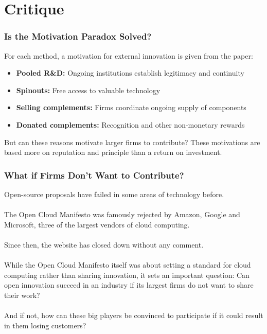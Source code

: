 \documentclass{beamer}
\begin{document}
\section{Critique}

\begin{frame}
\frametitle{Is the Motivation Paradox Solved?}
For each method, a motivation for external innovation is given from the paper:
\begin{itemize}
\item \textbf{Pooled R\&D:} Ongoing institutions establish legitimacy and continuity
\item \textbf{Spinouts:} Free access to valuable technology
\item \textbf{Selling complements:} Firms coordinate ongoing supply of components
\item \textbf{Donated complements:} Recognition and other non-monetary rewards
\end{itemize}

But can these reasons motivate larger firms to contribute? These motivations are based more on reputation and principle than a return on investment.
\end{frame}


\begin{frame}
\frametitle{What if Firms Don't Want to Contribute?}
Open-source proposals have failed in some areas of technology before.\\~\\

The Open Cloud Manifesto was famously rejected by Amazon, Google and Microsoft, three of the largest vendors of cloud computing.\\~\\

Since then, the website has closed down without any comment.\\~\\

While the Open Cloud Manifesto itself was about setting a standard for cloud computing rather than sharing innovation, it sets an important question: Can open innovation succeed in an industry if its largest firms do not want to share their work?\\~\\

And if not, how can these big players be convinced to participate if it could result in them losing customers?
\end{frame}
\end{document}

